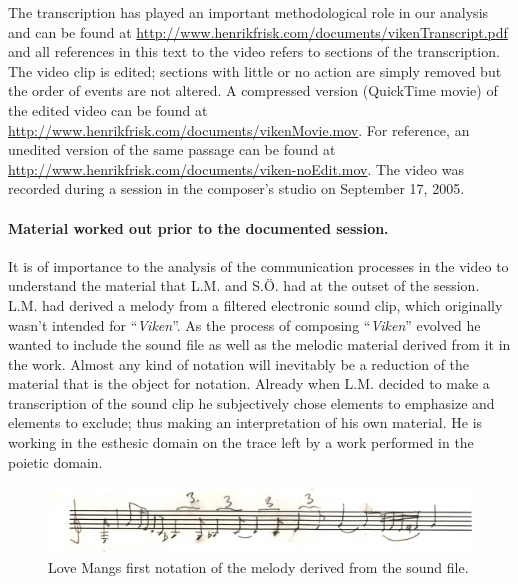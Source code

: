 \documentclass[10pt,letterpaper]{article}
\begin{document}
The transcription has played an important methodological role in our
analysis and can be found at
{\url{http://www.henrikfrisk.com/documents/vikenTranscript.pdf}}\newline
and all references in this text to the video refers to sections of the
transcription. The video clip is edited; sections with little or no
action are simply removed but the order of events are not altered. A
compressed version (QuickTime movie) of the edited video can be found at
{\url{http://www.henrikfrisk.com/documents/vikenMovie.mov}}. For
reference, an un\-edited version of the same passage can be found at
{\url{http://www.henrikfrisk.com/documents/viken-noEdit.mov}}. The
video was recorded during a session in the composer's studio on
September 17, 2005.

\paragraph{Material worked out prior to the documented session.}

It is of importance to the analysis of the communication processes in
the video to understand the material that L.M. and S.{\"O}. had at the
outset of the session. L.M. had derived a melody from a filtered
electronic sound clip, which originally wasn't intended for
``\emph{Viken}''. As the process of composing ``\emph{Viken}'' evolved
he wanted to include the sound file as well as the melodic material
derived from it in the work.  Almost any kind of notation will
inevitably be a reduction of the material that is the object for
notation. Already when L.M. decided to make a transcription of the sound
clip he subjectively chose elements to emphasize and elements to
exclude; thus making an interpretation of his own material. He is
working in the esthesic domain on the trace left by a work performed in
the poietic domain.

\begin{figure}
\begin{center}
\includegraphics[width=1.0\columnwidth]{img/viken} 
\caption{Love Mangs first notation of the melody derived from the sound file.}
\label{vikentrans}
\end{center}
\end{figure}
\end{document}
